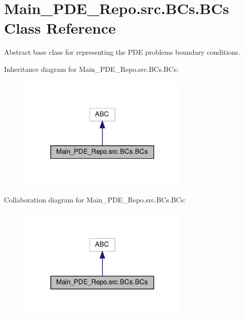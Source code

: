 \hypertarget{classMain__PDE__Repo_1_1src_1_1BCs_1_1BCs}{}\section{Main\+\_\+\+P\+D\+E\+\_\+\+Repo.\+src.\+B\+Cs.\+B\+Cs Class Reference}
\label{classMain__PDE__Repo_1_1src_1_1BCs_1_1BCs}


Abstract base class for representing the P\+DE problem\textquotesingle{}s boundary conditions.  




Inheritance diagram for Main\+\_\+\+P\+D\+E\+\_\+\+Repo.\+src.\+B\+Cs.\+B\+Cs\+:
\nopagebreak
\begin{figure}[H]
\begin{center}
\leavevmode
\includegraphics[width=234pt]{classMain__PDE__Repo_1_1src_1_1BCs_1_1BCs__inherit__graph}
\end{center}
\end{figure}


Collaboration diagram for Main\+\_\+\+P\+D\+E\+\_\+\+Repo.\+src.\+B\+Cs.\+B\+Cs\+:
\nopagebreak
\begin{figure}[H]
\begin{center}
\leavevmode
\includegraphics[width=234pt]{classMain__PDE__Repo_1_1src_1_1BCs_1_1BCs__coll__graph}
\end{center}
\end{figure}
